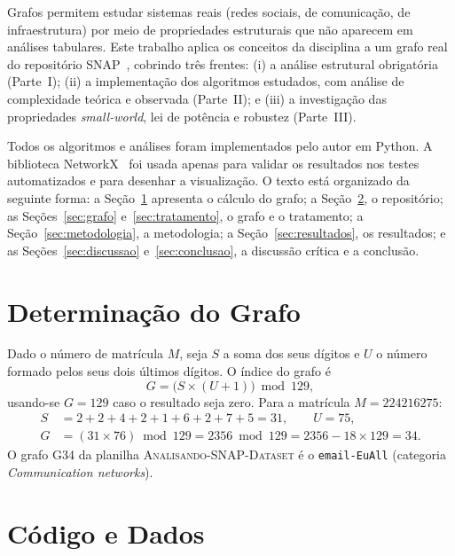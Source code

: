 \documentclass[sigconf]{webmedia}
\begin{document}
Grafos permitem estudar sistemas reais (redes sociais, de comunicação, de
infraestrutura) por meio de propriedades estruturais que não aparecem em análises
tabulares. Este trabalho aplica os conceitos da disciplina a um grafo real do
repositório SNAP~\cite{snapnets}, cobrindo três frentes: (i) a análise estrutural
obrigatória (Parte~I); (ii) a implementação dos algoritmos estudados, com análise de
complexidade teórica e observada (Parte~II); e (iii) a investigação das propriedades
\emph{small-world}, lei de potência e robustez (Parte~III).

Todos os algoritmos e análises foram implementados pelo autor em Python. A biblioteca
NetworkX~\cite{hagberg2008} foi usada apenas para validar os resultados nos testes
automatizados e para desenhar a visualização. O texto está organizado da seguinte forma:
a Seção~\ref{sec:calculo} apresenta o cálculo do grafo; a Seção~\ref{sec:codigo}, o
repositório; as Seções~\ref{sec:grafo} e~\ref{sec:tratamento}, o grafo e o tratamento;
a Seção~\ref{sec:metodologia}, a metodologia; a Seção~\ref{sec:resultados}, os
resultados; e as Seções~\ref{sec:discussao} e~\ref{sec:conclusao}, a discussão crítica
e a conclusão.

\section{Determinação do Grafo}
\label{sec:calculo}

Dado o número de matrícula $M$, seja $S$ a soma dos seus dígitos e $U$ o número formado
pelos seus dois últimos dígitos. O índice do grafo é
\begin{equation}
  G = \big(S \times (U + 1)\big) \bmod 129,
\end{equation}
usando-se $G = 129$ caso o resultado seja zero. Para a matrícula $M = 224216275$:
\begin{align*}
  S &= 2+2+4+2+1+6+2+7+5 = 31, \qquad U = 75,\\
  G &= (31 \times 76) \bmod 129 = 2356 \bmod 129 = 2356 - 18\times129 = 34.
\end{align*}
O grafo G34 da planilha \textsc{Analisando-SNAP-Dataset} é o \texttt{email-EuAll}
(categoria \emph{Communication networks}).

\section{Código e Dados}
\label{sec:codigo}
\end{document}
